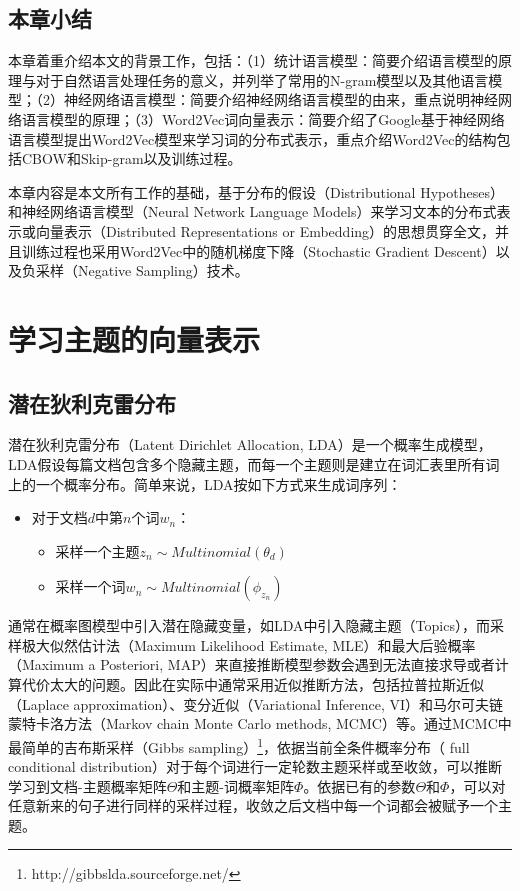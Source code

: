 \documentclass[master]{njuthesis}
\begin{document}
\section{本章小结}\label{sec_chap2_conclusions}

本章着重介绍本文的背景工作，包括：（1）统计语言模型：简要介绍语言模型的原理与对于自然语言处理任务的意义，并列举了常用的N-gram模型以及其他语言模型；（2）神经网络语言模型：简要介绍神经网络语言模型的由来，重点说明神经网络语言模型的原理；（3）Word2Vec词向量表示：简要介绍了Google基于神经网络语言模型提出Word2Vec模型来学习词的分布式表示，重点介绍Word2Vec的结构包括CBOW和Skip-gram以及训练过程。

本章内容是本文所有工作的基础，基于分布的假设（Distributional Hypotheses）和神经网络语言模型（Neural Network Language Models）来学习文本的分布式表示或向量表示（Distributed Representations or Embedding）的思想贯穿全文，并且训练过程也采用Word2Vec中的随机梯度下降（Stochastic Gradient Descent）以及负采样（Negative Sampling）技术。

\chapter{学习主题的向量表示}\label{chapter3_topic_representations}

\section{潜在狄利克雷分布}\label{sec_chap3_lda}

潜在狄利克雷分布（Latent Dirichlet Allocation, LDA）\cite{blei2003latent}是一个概率生成模型，LDA假设每篇文档包含多个隐藏主题，而每一个主题则是建立在词汇表里所有词上的一个概率分布。简单来说，LDA按如下方式来生成词序列：

\begin{itemize}
\item 对于文档$d$中第$n$个词$w_n$：
		\begin{itemize}
		\item 采样一个主题$z_n\sim Multinomial(\theta_d)$
		\item 采样一个词$w_n\sim Multinomial(\phi_{z_n})$
		\end{itemize}
\end{itemize}

通常在概率图模型中引入潜在隐藏变量，如LDA中引入隐藏主题（Topics），而采样极大似然估计法（Maximum Likelihood Estimate, MLE）和最大后验概率（Maximum a Posteriori, MAP）来直接推断模型参数会遇到无法直接求导或者计算代价太大的问题\cite{blei2003latent}。因此在实际中通常采用近似推断方法，包括拉普拉斯近似（Laplace approximation）\cite{wolfinger1993laplace}、变分近似（Variational Inference, VI）\cite{jordan1999introduction,wainwright2008graphical}和马尔可夫链蒙特卡洛方法（Markov chain Monte Carlo methods, MCMC）\cite{andrieu2003introduction}等。通过MCMC中最简单的吉布斯采样（Gibbs sampling）\footnote{http://gibbslda.sourceforge.net/}，依据当前全条件概率分布（ full conditional
distribution）对于每个词进行一定轮数主题采样或至收敛，可以推断学习到文档-主题概率矩阵$\Theta$和主题-词概率矩阵$\Phi$\cite{griffiths2004finding}。依据已有的参数$\Theta$和$\Phi$，可以对任意新来的句子进行同样的采样过程，收敛之后文档中每一个词都会被赋予一个主题。
\end{document}
